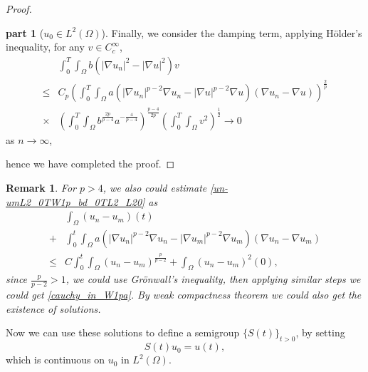 \documentclass[11pt]{amsart}
\newtheorem{remark}[theorem]{Remark}
\theoremstyle{definition}
\newtheorem{proofpart}{part}
\numberwithin{equation}{section}
\newcommand*\abs[1]{\lvert#1\rvert}
\newcommand*\Brace[1]{\lbrace#1\rbrace}
\begin{document}
\begin{proof}
\begin{proofpart}[$u_0 \in L^2(\Omega)$]
	Finally, we consider the damping term, applying H\"older's inequality,
	for any $v \in C_c^\infty$,
	\begin{equation}
		\begin{split}
			& \int_0^T\int_{\Omega}b\left(\abs{\nabla u_n}^2
			- \abs{\nabla u}^2\right)v\\
			\leq{} & C_p\left(\int_0^T\int_{\Omega}a
			\left(\abs{\nabla u_n}^{p-2}\nabla u_n
			- \abs{\nabla u}^{p-2}\nabla u\right)
			\left(\nabla u_n - \nabla u\right)\right)^{\frac{2}{p}}\\
			\times{} & \left(\int_0^T\int_{\Omega}b^{\frac{2p}{p-4}}a^{-\frac{4}{p-4}}\right)^{\frac{p-4}{2p}}
			\left(\int_0^T\int_{\Omega}v^2\right)^{\frac{1}{2}} \to 0
		\end{split}
	\end{equation}
	as $n \to \infty$,
\end{proofpart}
hence we have completed the proof.
\end{proof}
\begin{remark}
	For $p>4$, we also could estimate \cref{un-umL2_0TW1p_bd_0TL2_L20} as
	\begin{equation}
		\begin{split}
			& \int_{\Omega}\left( u_n-u_m \right)(t)\\
			+{} & \int_{0}^{t}\int_{\Omega}a
			\left(\abs{\nabla u_n}^{p-2}\nabla u_n
			- \abs{\nabla u_m}^{p-2}\nabla u_m\right)
			\left(\nabla u_n - \nabla u_m\right)\\
			\leq{} & C\int_0^t\int_{\Omega}
			\left( u_n-u_m \right)^{\frac{p}{p-2}}
			+ \int_{\Omega}\left( u_n-u_m \right)^2(0),
		\end{split}
	\end{equation}
	since $\frac{p}{p-2}>1$, we could use Gr\"onwall's inequality,
	then applying similar steps we could get \cref{cauchy_in_W1pa}.
	By weak compactness theorem we could also get the existence of solutions.
\end{remark}
Now we can use these solutions to define a semigroup $\Brace{S(t)}_{t>0}$,
by setting
\begin{equation}
	S(t)u_0 = u(t),
\end{equation}
which is continuous on $u_{0}$ in $L^2(\Omega)$.
\end{document}
